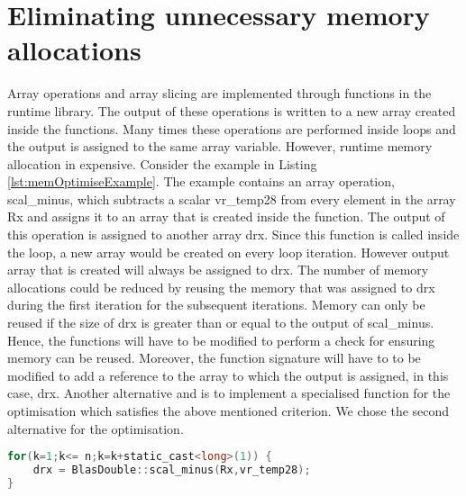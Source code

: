 \section{Eliminating unnecessary memory allocations}
\label{sec:memoptimise}
Array operations and array slicing are implemented through functions in the runtime library. The output of these operations is written to a new array created inside the functions. Many times these operations are performed inside loops and the output is assigned to the same array variable. However, runtime memory allocation in expensive. Consider the example in Listing \ref{lst:memOptimiseExample}. The example contains an array operation, scal\_minus, which subtracts a scalar vr\_temp28  from every element in the array Rx and assigns it to an array that is created inside the function. The output of this operation is assigned to another array drx. Since this function is called inside the loop, a new array would be created on every loop iteration. However output array that is created will always be assigned to drx. The number of memory allocations could be reduced by reusing the memory that was assigned to drx during the first iteration for the subsequent iterations. Memory can only be reused if the size of drx is greater than or equal to the output of scal\_minus. Hence, the functions will have to be modified to perform a check for ensuring memory can be reused. Moreover, the function signature will have to to be modified to add a reference to the array to which the output is assigned, in this case, drx. Another alternative and is to implement a specialised function for the optimisation which satisfies the above mentioned criterion. We chose the second alternative for the optimisation. 
\begin{lstlisting}[float,language=c,caption={An example of an array operation which is optimised },label={lst:memOptimiseExample}]
for(k=1;k<= n;k=k+static_cast<long>(1)) {
	drx = BlasDouble::scal_minus(Rx,vr_temp28);
}
\end{lstlisting}

